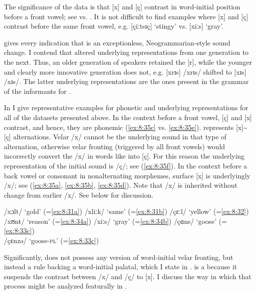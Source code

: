 The significance of the  data is that [x] and [ç] contrast in word-initial position before a front vowel; see  vs. . It is not difficult to find examples where [x] and [ç] contrast before the same front vowel, e.g. [çiːtsɪç] ‘stingy’ vs. [xiːs] ‘gray’.

\citet{Schütze1953} gives every indication that  is an exceptionless, Neo\-gram\-mar\-ian-style sound change. I contend that  altered underlying representations from one generation to the next. Thus, an older generation of speakers retained the [r], while the younger and clearly more innovative generation does not, e.g. [xrɪs] /xrɪs/ shifted to [xɪs] /xɪs/. The latter underlying representations are the ones present in the grammar of the informants for \citet{Schütze1953}.

In  I give representative examples for phonetic and underlying representations for all of the datasets presented above. In the context before a front vowel, [ç] and [x] contrast, and hence, they are phonemic (\ref{ex:8:35c} vs. \ref{ex:8:35e}).  represents [x]{\textasciitilde}[ç] alternations. Velar /x/ cannot be the underlying sound in that type of alternation, otherwise velar fronting (triggered by all front vowels) would incorrectly convert the /x/ in words like  into [ç]. For this reason the underlying representation of the initial sound is /ç/; see (\ref{ex:8:35f}). In the context before a back vowel or consonant in nonalternating morphemes, surface [x] is underlyingly /x/; see (\ref{ex:8:35a}, \ref{ex:8:35b}, \ref{ex:8:35d}). Note that /x/ is inherited without change from earlier /x/. See below for discussion.

\ea\label{ex:8:35}
\ea\label{ex:8:35a} \relax [xɔlt]  \tab /xɔlt/   \tab ‘gold’   \tab (=\ref{ex:8:31a})
\ex\label{ex:8:35b} \relax [xliːk] \tab  /xliːk/ \tab ‘same’   \tab (=\ref{ex:8:31b})
\ex\label{ex:8:35c} \relax [çɛːl]  \tab /çɛːl/   \tab ‘yellow’ \tab (=\ref{ex:8:32})
\ex\label{ex:8:35d} \relax [xʊnt]  \tab /xʊnt/   \tab ‘reason’ \tab (=\ref{ex:8:34a})
\ex\label{ex:8:35e} \relax [xiːs]  \tab /xiːs/   \tab ‘gray’   \tab (=\ref{ex:8:34b})
\ex\label{ex:8:35f} \relax [xɑns]  \tab /çɑns/   \tab ‘goose’  \tab (=\ref{ex:8:33c})\\
    \relax [çɛnzə] \tab  /çɛnzə/ \tab ‘goose-\textsc{pl}’  \tab (=\ref{ex:8:33c})
\z 
\z 

Significantly,  does not possess any version of word-initial velar fronting, but instead a rule backing a word-initial palatal, which I state in .  is a  because it suspends the contrast between /x/ and /ç/ to [x]. I discuss the way in which that process might be analyzed featurally in .

